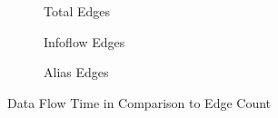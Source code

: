 \documentclass[../draft.tex]{subfiles}
\begin{document}
    \begin{figure}[tbp]
        \begin{subfigure}[b]{\textwidth}
            \centering
            \begin{subfigure}[]{0.45\textwidth}
                \centering
                \resizebox{\columnwidth}{!}{
                    
                }
            \end{subfigure}
            \qquad
            \begin{subfigure}[]{0.45\textwidth}
                \centering
                \resizebox{\columnwidth}{!}{
                    
                }
            \end{subfigure}
            \caption{Total Edges}
            \label{f:dfedgestotal}
        \end{subfigure}
        \bigbreak
        \begin{subfigure}[b]{\textwidth}
            \centering
            \begin{subfigure}[]{0.45\textwidth}
                \centering
                \resizebox{\columnwidth}{!}{
                    
                }
            \end{subfigure}
            \qquad
            \begin{subfigure}[]{0.45\textwidth}
                \centering
                \resizebox{\columnwidth}{!}{
                    
                }
            \end{subfigure}
            \caption{Infoflow Edges}
            \label{f:dfedgesi}
        \end{subfigure}
        \bigbreak
        \begin{subfigure}[b]{\textwidth}
            \centering
            \begin{subfigure}[]{0.45\textwidth}
                \centering
                \resizebox{\columnwidth}{!}{
                    
                }
            \end{subfigure}
            \qquad
            \begin{subfigure}[]{0.45\textwidth}
                \centering
                \resizebox{\columnwidth}{!}{
                    
                }
            \end{subfigure}
            \caption{Alias Edges}
            \label{f:dfedgesa}
        \end{subfigure}
        \caption{Data Flow Time in Comparison to Edge Count}
        \label{f:dfedges}
    \end{figure}
\end{document}
